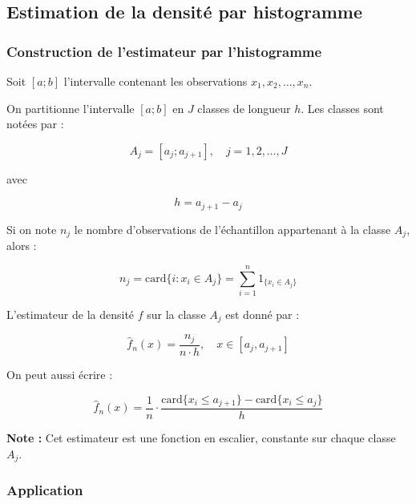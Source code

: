 \documentclass[
  12pt,
]{article}
\begin{document}
\subsection{Estimation de la densité par
histogramme}\label{estimation-de-la-densituxe9-par-histogramme}

\subsubsection{Construction de l'estimateur par
l'histogramme}\label{construction-de-lestimateur-par-lhistogramme}

Soit \([a;b]\) l'intervalle contenant les observations
\(x_1, x_2, \ldots, x_n\).

On partitionne l'intervalle \([a;b]\) en \(J\) classes de longueur
\(h\). Les classes sont notées par :

\[
A_j = [a_j; a_{j+1}], \quad j = 1, 2, \ldots, J
\]

avec

\[
h = a_{j+1} - a_j
\]

Si on note \(n_j\) le nombre d'observations de l'échantillon appartenant
à la classe \(A_j\), alors :

\[
n_j = \mathrm{card}\{ i : x_i \in A_j \} = \sum_{i=1}^n 1_{\{x_i \in A_j\}}
\]

L'estimateur de la densité \(f\) sur la classe \(A_j\) est donné par :

\[
\hat{f}_n(x) = \frac{n_j}{n \cdot h}, \quad x \in [a_j, a_{j+1}]
\]

On peut aussi écrire :

\[
\hat{f}_n(x) = \frac{1}{n} \cdot \frac{\mathrm{card}\{ x_i \leq a_{j+1} \} - \mathrm{card}\{ x_i \leq a_j \}}{h}
\]

\textbf{Note :} Cet estimateur est une fonction en escalier, constante
sur chaque classe \(A_j\).

\subsubsection{Application}\label{application-2}
\end{document}

